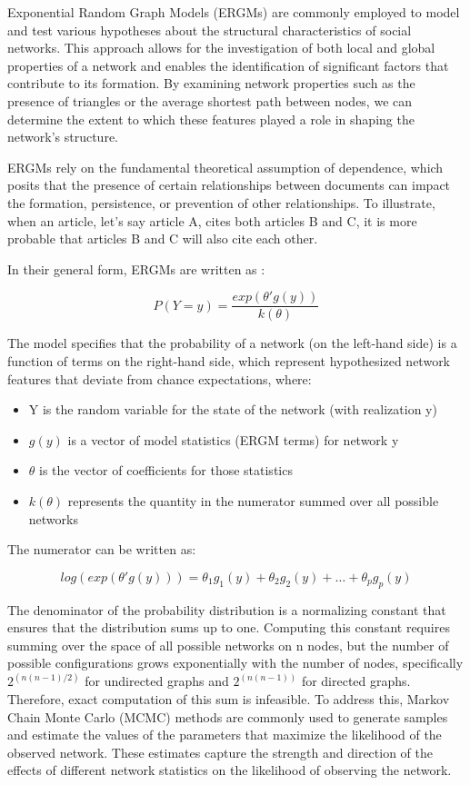 Exponential Random Graph Models (ERGMs) are commonly employed to model and test various hypotheses about the structural characteristics of social networks. This approach allows for the investigation of both local and global properties of a network and enables the identification of significant factors that contribute to its formation. By examining network properties such as the presence of triangles or the average shortest path between nodes, we can determine the extent to which these features played a role in shaping the network's structure.

ERGMs rely on the fundamental theoretical assumption of dependence, which posits that the presence of certain relationships between documents can impact the formation, persistence, or prevention of other relationships. To illustrate, when an article, let's say article A, cites both articles B and C, it is more probable that articles B and C will also cite each other.

In their general form, ERGMs are written as \citep{hunter2008}:

$$
P(Y=y) = \frac{exp(\theta' g(y))}{k(\theta)}
$$

The model specifies that the probability of a network (on the left-hand side) is 
a function of terms on the right-hand side, which represent hypothesized network features that 
deviate from chance expectations, where:

\begin{itemize}
    \item Y is the random variable for the state of the network (with realization y)
    \item $g(y)$ is a vector of model statistics (ERGM terms) for network y
    \item $\theta$ is the vector of coefficients for those statistics
    \item $k(\theta)$ represents the quantity in the numerator summed over all possible networks
\end{itemize}

The numerator can be written as:

$$
log(exp(\theta' g(y))) = \theta_1 g_1(y) + \theta_2 g_2(y) + \dots + \theta_p g_p(y)
$$

The denominator of the probability distribution is a normalizing constant that ensures that the distribution sums up to one. Computing this constant requires summing over the space of all possible networks on n nodes, but the number of possible configurations grows exponentially with the number of nodes, specifically $2^{(n(n-1)/2)}$ for undirected graphs and $2^{(n(n-1))}$ for directed graphs. Therefore, exact computation of this sum is infeasible. To address this, Markov Chain Monte Carlo (MCMC) methods are commonly used to generate samples and estimate the values of the parameters that maximize the likelihood of the observed network. These estimates capture the strength and direction of the effects of different network statistics on the likelihood of observing the network.

